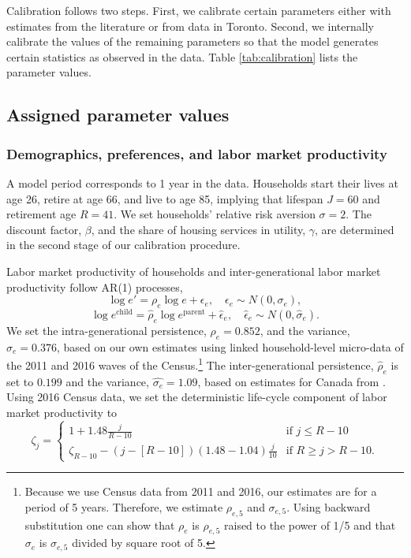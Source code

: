 \documentclass[parskip=full]{article}
\begin{document}
Calibration follows two steps. First, we calibrate certain parameters either with estimates from the literature or from data in Toronto. Second, we internally calibrate the values of the remaining parameters so that the model generates certain statistics as observed in the data. Table \ref{tab:calibration} lists the parameter values. 

\subsection{Assigned parameter values}

\subsubsection{Demographics, preferences, and labor market productivity}
A model period corresponds to 1 year in the data. Households start their lives at age 26, retire at age 66, and live to age 85, implying that lifespan $J=60$ and retirement age $R=41$. We set households' relative risk aversion $\sigma=2$. The discount factor, $\beta$, and the share of housing services in utility, $\gamma$, are determined in the second stage of our calibration procedure.

Labor market productivity of households and inter-generational labor market productivity follow AR(1) processes,
\begin{equation*}
  \log e' = \rho_{e} \log e + \epsilon_{e},\quad \epsilon_{e}\sim N(0,\sigma_{e}),
\end{equation*}
\begin{equation*}
\log e^{\text{child}} = \hat{\rho}_{e} \log e^{\text{parent}} + \hat{\epsilon}_{e},\quad \hat{\epsilon}_{e}\sim N(0,\hat{\sigma}_{e}).
\end{equation*}
We set the intra-generational persistence, $\rho_{e}=0.852$, and the variance, $\sigma_{e}=0.376$, based on our own estimates using linked household-level micro-data of the 2011 and 2016 waves of the Census.\footnote{Because we use Census data from 2011 and 2016, our estimates are for a period of 5 years. Therefore, we estimate $\rho_{e,5}$ and $\sigma_{e,5}$. Using backward substitution one can show that $\rho_{e}$ is $\rho_{e,5}$ raised to the power of 1/5 and that $\sigma_{e}$ is $\sigma_{e,5}$ divided by square root of 5.} The inter-generational persistence, $\hat{\rho}_{e}$ is set to $0.199$ and the variance, $\hat{\sigma_{e}}=1.09$, based on estimates for Canada from \citet{corak-heisz-1999}. Using 2016 Census data, we set the deterministic life-cycle component of labor market productivity to 
\begin{equation*}
\zeta_j = \begin{cases}
1+1.48 \frac{j}{R-10} &\text{if $j\leq R-10$}\\
\zeta_{R-10}-\left(j-\left[R-10\right]\right) (1.48-1.04) \frac{j}{10} &\text{if $R \geq j>R-10$}.
\end{cases}
\end{equation*}
\end{document}
